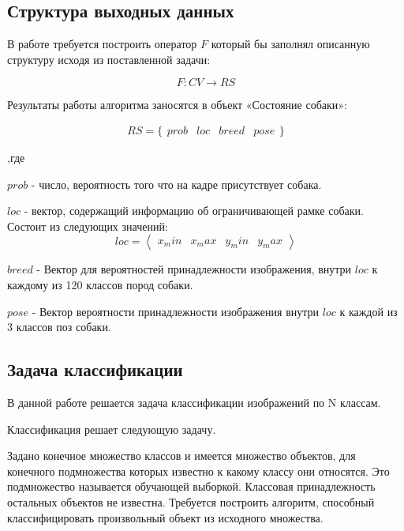 \subsection{Структура выходных данных}\label{input_struct}
В работе требуется построить оператор $F$  который бы заполнял описанную структуру исходя из поставленной задачи:

\begin{equation}
    F:CV \rightarrow RS
\end{equation}

Результаты работы алгоритма заносятся в объект «Состояние собаки»:

\begin{equation}
    RS = \{\begin{matrix}
            prob & loc & breed & pose
        \end{matrix}\}
\end{equation}

,где

$prob$ - число, вероятность того что на кадре присутствует собака.

$loc$ - вектор, содержащий информацию об ограничивающей рамке собаки. Состоит из следующих значений:
\[
loc = \left\langle
            \begin{matrix}
                x_min & x_max & y_min & y_max
            \end{matrix}
\right\rangle
\]

$breed$ - Вектор для вероятностей принадлежности изображения, внутри $loc$ к каждому из 120 классов пород собаки.

$pose$ - Вектор вероятности принадлежности изображения внутри $loc$ к каждой из 3 классов поз собаки.

\subsection{Задача классификации}\label{class_task}
В данной работе решается задача классификации изображений по N классам. 

Классификация\cite{classification} решает следующую задачу.

Задано конечное множество классов и имеется множество объектов, для конечного подмножества которых известно к какому классу они относятся. Это подмножество называется обучающей выборкой. Классовая принадлежность остальных объектов не известна. Требуется построить алгоритм, способный классифицировать произвольный объект из исходного множества.

